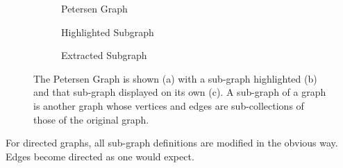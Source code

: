 \begin{figure}
  \centering
  \begin{subfigure}{0.32\textwidth}
    \centering
    
    \caption{Petersen Graph}
  \end{subfigure}
  \begin{subfigure}{0.32\textwidth}
    \centering
    
    \caption{Highlighted Subgraph}
  \end{subfigure}
  \begin{subfigure}{0.32\textwidth}
    \centering
    
    \caption{Extracted Subgraph}
  \end{subfigure}
  \caption{\label{fig:subg}%
The Petersen Graph is shown (a) with a sub-graph highlighted (b) and that sub-graph displayed on its own (c).
A sub-graph of a graph is another graph whose vertices and edges are sub-collections of those of the original graph.
}%
\end{figure}
%
%
\begin{remark}
For directed graphs, all sub-graph definitions are modified in the obvious way.
Edges become directed as one would expect.
\end{remark}
